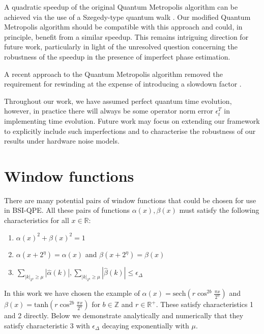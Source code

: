 \documentclass[aps,floatfix,10pt,amssymb,amsfont,amsmath,superscriptaddress,float,nofootinbib,longbibliography,nobalancelastpage,twocolumn]{revtex4-2}
\begin{document}
A quadratic speedup \cite{} of the original Quantum Metropolis algorithm can be achieved via the use of a Szegedy-type quantum walk \cite{}. Our modified Quantum Metropolis algorithm should be compatible with this approach and could, in principle, benefit from a similar speedup. This remains intriguing direction for future work, particularly in light of the unresolved question concerning the robustness of the speedup in the presence of imperfect phase estimation. 

A recent approach to the Quantum Metropolis algorithm removed the requirement for rewinding at the expense of introducing a slowdown factor \cite{}.  

Throughout our work, we have assumed perfect quantum time evolution, however, in practice there will always be some operator norm error $\epsilon^T_t$ in implementing time evolution. Future work may focus on extending our framework to explicitly include such imperfections and to characterise the robustness of our results under hardware noise models.



\appendix
\onecolumngrid    
\section{Window functions}
\label{section:appendix}
There are many potential pairs of window functions that could be chosen for use in BSI-QPE. All these pairs of functions $\alpha(x), \beta(x)$ must satisfy the following characteristics for all $x \in \mathbb{R}$:
\begin{enumerate}
    \item $\alpha(x)^2+\beta(x)^2 =1$
    \item $\alpha(x+2^{\eta}) = \alpha(x)$ and $\beta(x+2^{\eta}) = \beta(x)$
    \item $\sum_{|k|_{2^{\eta}}\geq\mu}|\hat \alpha(k)|, \sum_{|k|_{2^{\eta}}\geq\mu}|\hat \beta(k)| \leq \epsilon_\Delta$
\end{enumerate}
In this work we have chosen the example of $\alpha(x) = \text{sech}( r\cos^{2b} \frac{\pi x}{2^{\eta}})$ and $\beta(x) = \text{tanh}(r \cos^{2b} \frac{\pi x}{2^{\eta}})$ for $b \in \mathbb{Z}$ and $r \in \mathbb{R}^+$. These satisfy characteristics 1 and 2 directly. Below we demonstrate analytically and numerically that they satisfy characteristic 3 with $\epsilon_{\Delta}$ decaying exponentially with $\mu$.
\end{document}
